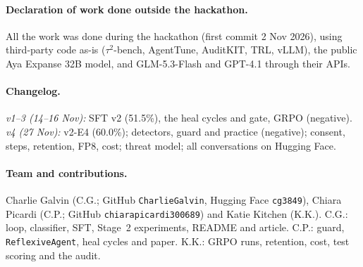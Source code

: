 \documentclass[11pt]{article}
\begin{document}
\paragraph{Declaration of work done outside the hackathon.} All the work was done during the hackathon (first commit 2 Nov 2026), using third-party code as-is ($\tau^2$-bench, AgentTune, AuditKIT, TRL, vLLM), the public Aya Expanse 32B model, and GLM-5.3-Flash and GPT-4.1 through their APIs.

\paragraph{Changelog.} \emph{v1--3 (14--16 Nov):} SFT v2 (51.5\%), the heal cycles and gate, GRPO (negative). \emph{v4 (27 Nov):} v2-E4 (60.0\%); detectors, guard and practice (negative); consent, steps, retention, FP8, cost; threat model; all conversations on Hugging Face.

\paragraph{Team and contributions.} Charlie Galvin (C.G.; GitHub \texttt{CharlieGalvin}, Hugging Face \texttt{cg3849}), Chiara Picardi (C.P.; GitHub \texttt{chiarapicardi300689}) and Katie Kitchen (K.K.). %
C.G.: loop, classifier, SFT, Stage~2 experiments, README and article. C.P.: guard, \texttt{ReflexiveAgent}, heal cycles and paper. K.K.: GRPO runs, retention, cost, test scoring and the audit. %
\end{document}
